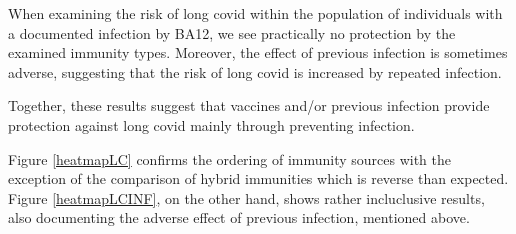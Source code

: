 \documentclass[sn-basic]{sn-jnl}%
\theoremstyle{thmstyleone}%
\theoremstyle{thmstyletwo}%
\theoremstyle{thmstylethree}%
\begin{document}
When examining the risk of long covid within the population of individuals with a documented infection by BA12, we see practically no protection by the examined immunity types. Moreover, the effect of previous infection is sometimes adverse, suggesting that the risk of long covid is increased by repeated infection. 

Together, these results suggest that vaccines and/or previous infection provide protection against long covid mainly through preventing infection. 

Figure \ref{heatmapLC} confirms the ordering of immunity sources with the exception of the comparison of hybrid immunities which is reverse than expected. Figure \ref{heatmapLCINF}, on the other hand, shows rather incluclusive results, also documenting the adverse effect of previous infection, mentioned above.

\end{document}

